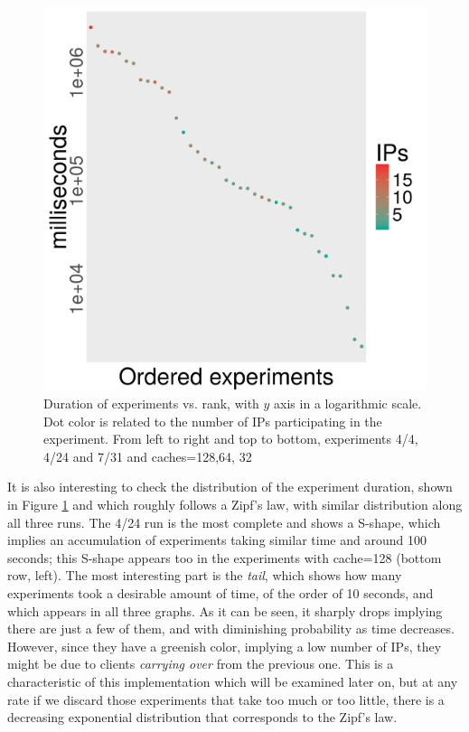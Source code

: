 \documentclass[letterpaper]{article}
\begin{document}
\begin{figure}[!htb]
\includegraphics[width=0.32\linewidth]{time-vs-rank-alife-32.png}
\caption{Duration of experiments vs. rank, with $y$ axis in a
  logarithmic scale. Dot color is related to the number of IPs
  participating in the experiment. From left to right and top to bottom, experiments
  4/4, 4/24 and 7/31 and caches=128,64, 32} 
\label{fig:zipf:os}
\end{figure}
%
It is also interesting to check the distribution of the experiment
duration, shown in Figure \ref{fig:zipf:os} and which roughly follows
a Zipf's law, with similar distribution along all three runs. The 4/24
run is the most complete and shows a S-shape, which implies an
accumulation of experiments taking similar time and around 100
seconds; this S-shape appears too in the experiments with cache=128
(bottom row, left). The most interesting part is the {\em tail}, which shows how
many experiments took a desirable amount of time, of the order of
10 seconds, and which appears in all three graphs. As it can be seen,
it sharply drops implying there are 
just a few of them, and with diminishing probability as time
decreases. However, since they have a greenish color, implying a low
number of IPs, they might be due to clients {\em carrying over} from
the previous one. This is a characteristic of this implementation
which will be examined later on, but at any rate if we discard those
experiments that take too much or too little, there is a decreasing
exponential distribution that corresponds to the Zipf's law.
\end{document}
